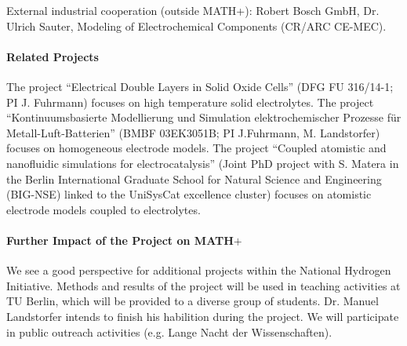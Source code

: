 \documentclass[a4paper,10pt]{article}
\begin{document}
External industrial cooperation (outside MATH+): Robert Bosch GmbH, Dr. Ulrich Sauter, Modeling of Electrochemical Components (CR/ARC CE-MEC).

\paragraph{Related Projects}
The project ``Electrical Double Layers in Solid Oxide Cells'' (DFG FU 316/14-1; PI J. Fuhrmann) focuses
  on high temperature solid electrolytes.
The project  ``Kontinuumsbasierte Modellierung und Simulation elektrochemischer Prozesse für Metall-Luft-Batterien''
  (BMBF  03EK3051B; PI J.Fuhrmann, M. Landstorfer) focuses on homogeneous electrode models.
The project  ``Coupled atomistic and nanofluidic simulations for electrocatalysis'' (Joint PhD project with S. Matera
  in the  Berlin International Graduate School for Natural Science and Engineering (BIG-NSE) linked
  to the UniSysCat excellence cluster) focuses on atomistic electrode models coupled to electrolytes.


\paragraph{Further Impact of the Project on MATH$+$}
We see a good perspective for additional projects within the National Hydrogen Initiative. 
%
Methods and results of the project will be used in teaching activities at TU Berlin,
%
which will be provided to a diverse group of students.
%
%
Dr. Manuel Landstorfer intends to finish his habilition during the project. %
%
We will participate in public outreach activities (e.g. Lange Nacht der Wissenschaften).
\end{document}
